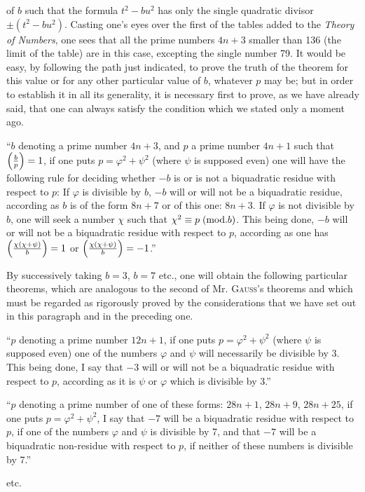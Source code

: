 \par\noindent
of $b$ such that the formula $t^2-bu^2$ has only the single quadratic divisor $\pm(t^2-bu^2)$.
Casting one's eyes over the first of the tables added to the \emph{Theory of Numbers}, one sees
that all the prime numbers $4n+3$ smaller than 136 (the limit of the table) are in this case,
excepting the single number 79. It would be easy, by following the path just indicated, to prove
the truth of the theorem for this value or for any other particular value of $b$, whatever $p$ may
be; but in order to establish it in all its generality, it is necessary first to prove, as we have
already said, that one can always satisfy the condition which we stated only a moment ago.
\par\indent
“$b$ denoting a prime number $4n+3$, and $p$ a prime number $4n+1$ such that $\left(\frac{b}{p}\right)=1$, if
one puts $p=\varphi^2+\psi^2$ (where $\psi$ is supposed even) one will have the following rule for
deciding whether $-b$ is or is not a biquadratic residue with respect to $p$: If $\varphi$ is
divisible by $b$, $-b$ will or will not be a biquadratic residue, according as $b$ is of the form
$8n+7$ or of this one: $8n+3$. If $\varphi$ is not divisible by $b$, one will seek a number $\chi$
such that $\chi^2\equiv p\;(\mathrm{mod}.b)$. This being done, $-b$ will or will not be a biquadratic residue
with respect to $p$, according as one has $\left(\frac{\chi(\chi+\psi)}{b}\right)=1$ or
$\left(\frac{\chi(\chi+\psi)}{b}\right)=-1$.”
\par\indent
By successively taking $b=3$, $b=7$ etc., one will obtain the following particular theorems, which
are analogous to the second of Mr. \textsc{Gauss}'s theorems and which must be regarded as
rigorously proved by the considerations that we have set out in this paragraph and in the
preceding one.
\par\indent
“$p$ denoting a prime number $12n+1$, if one puts $p=\varphi^2+\psi^2$ (where $\psi$ is supposed
even) one of the numbers $\varphi$ and $\psi$ will necessarily be divisible by 3. This being done,
I say that $-3$ will or will not be a biquadratic residue with respect to $p$, according as it is
$\psi$ or $\varphi$ which is divisible by 3.”
\par\indent
“$p$ denoting a prime number of one of these forms: $28n+1$, $28n+9$, $28n+25$, if one puts
$p=\varphi^2+\psi^2$, I say that $-7$ will be a biquadratic residue with respect to $p$, if one of
the numbers $\varphi$ and $\psi$ is divisible by 7, and that $-7$ will be a biquadratic
non-residue with respect to $p$, if neither of these numbers is divisible by 7.”
\par\indent
etc.
